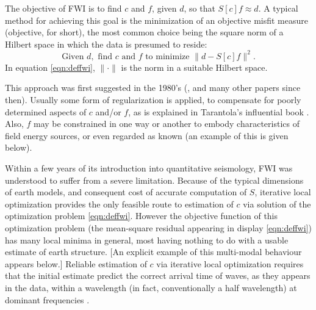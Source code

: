The objective of FWI is to find $c$ and $f$, given $d$, so that
$S[c]f \approx d$. A typical method for achieving this goal is
the minimization of an objective misfit measure (objective, for
short), the most common choice being the square norm of a Hilbert
space in which the data is presumed to reside:
\begin{equation}
  \label{eqn:deffwi}
  \mbox{Given } d, \mbox{ find }c \mbox{ and }f \mbox{ to
    minimize }
  \|d -  S[c]f\|^2.
\end{equation}
In equation \ref{eqn:deffwi}, $\|\cdot\|$ is the norm in a suitable
Hilbert space.

This approach was first suggested in the 1980's
(\cite{BamChavLai:79,Tara:84a,KolbColLai:86,Crasetal:90}, and many
other papers since then). Usually some form of regularization is
applied, to compensate for poorly determined aspects of $c$ and/or
$f$, as is explained in Tarantola's influential book
\cite[]{Tarantola:05}. Also, $f$ may be constrained in one way or
another to embody characteristics of field energy sources, or even
regarded as known (an example of this is given below).

Within a few years of its introduction into quantitative seismology,
FWI was understood to suffer from a severe limitation. Because of the
typical dimensions of earth models, and consequent cost of accurate
computation of $S$, iterative local optimization provides the only
feasible route to estimation of $c$ via solution of the optimization
problem \ref{eqn:deffwi}. However the objective function of this
optimization problem (the mean-square residual appearing in display \ref{eqn:deffwi}) has many local minima in general, most
having nothing to do with a usable estimate of earth structure. [An
explicit example of this multi-modal behaviour appears below.]
Reliable estimation of $c$ via iterative local optimization requires
that the initial estimate predict the correct arrival time of waves,
as they appears in the data, within a wavelength (in fact,
conventionally a half wavelength) at dominant
frequencies \cite[]{GauTarVir:86,VirieuxOperto:09}.

